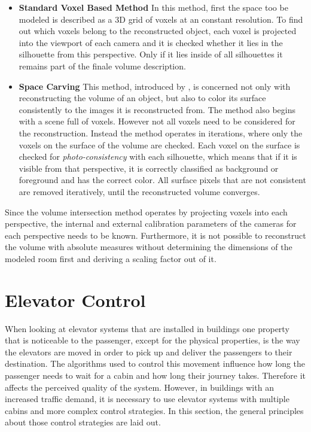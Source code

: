 \begin{itemize}
    \item \textbf{Standard Voxel Based Method} 
    In this method, first the space too be modeled is described as a \ac{3D} grid of voxels at an constant resolution.
    To find out which voxels belong to the reconstructed object,
    each voxel is projected into the viewport of each camera 
    and it is checked whether it lies in the silhouette from this perspective.
    Only if it lies inside of all silhouettes
    it remains part of the finale volume description.
    \item \textbf{Space Carving}
    This method, introduced by \textcite[][]{kutulakos1999spacecarving},
    is concerned not only with reconstructing the volume of an object, but also to color its surface consistently to the images it is reconstructed from.
    The method also begins with a scene full of voxels. 
    However not all voxels need to be considered for the reconstruction.
    Instead the method operates in iterations, where only the voxels on the surface of the volume are checked.
    Each voxel on the surface is checked for \emph{photo-consistency} with each silhouette, which means that if it is visible from that perspective, it is correctly classified as background or foreground and has the correct color.
    All surface pixels that are not consistent are removed iteratively, until the reconstructed volume converges.
\end{itemize}

Since the volume intersection method operates by projecting voxels into each perspective,
the internal and external calibration parameters of the cameras for each perspective needs to be known.
Furthermore, it is not possible to reconstruct the volume with absolute measures without determining the dimensions of the modeled room first and deriving a scaling factor out of it.

\section{Elevator Control}

When looking at elevator systems that are installed in buildings
one property that is noticeable to the passenger, except for the physical properties, is the way the elevators are moved in order to pick up and deliver the passengers to their destination.
The algorithms used to control this movement influence how long the passenger needs to wait for a cabin and how long their journey takes.
Therefore it affects the perceived quality of the system.
However, in buildings with an increased traffic demand, it is necessary to use elevator systems with multiple cabins and more complex control strategies.
In this section, the general principles about those control strategies are laid out.


